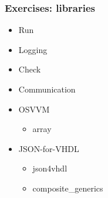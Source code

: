 \documentclass{beamer}
\begin{document}
\begin{frame}
\frametitle{Exercises: libraries}
\begin{itemize}
  \item Run
  \href{http://vunit.github.io/run/user_guide.html}{\faBook}
  \href{https://github.com/VUnit/vunit/tree/master/examples/vhdl/run}{\faCode}
  \vspace{.5em}

  \item Logging
  \href{http://vunit.github.io/logging/user_guide.html}{\faBook}
  \href{https://github.com/VUnit/vunit/tree/master/examples/vhdl/logging}{\faCode}
  \vspace{.5em}

  \item Check
  \href{http://vunit.github.io/check/user_guide.html}{\faBook}
  \href{https://github.com/VUnit/vunit/tree/master/examples/vhdl/check}{\faCode}
  \vspace{.5em}

  \item Communication
  \href{http://vunit.github.io/com/user_guide.html}{\faBook}
  \href{https://github.com/VUnit/vunit/tree/master/examples/vhdl/com/}{\faCode}
  \vspace{1em}

  \item OSVVM
  \begin{itemize}
    \item array
    \href{https://github.com/VUnit/vunit/tree/master/examples/vhdl/array}{\faCode}
  \end{itemize}
  \vspace{.5em}

  \item JSON-for-VHDL
  \begin{itemize}
    \item json4vhdl
    \href{https://github.com/VUnit/vunit/tree/master/examples/vhdl/json4vhdl}{\faCode}
    \item composite\_generics
    \href{https://github.com/VUnit/vunit/tree/master/examples/vhdl/composite_generics}{\faCode}
  \end{itemize}
  \vspace{1em}
\end{itemize}

\end{frame}
\end{document}
